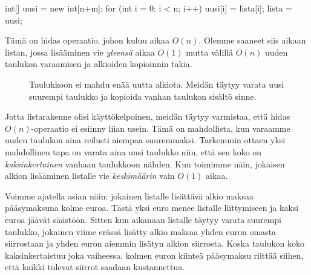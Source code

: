 \begin{code}
int[] uusi = new int[n+m];
for (int i = 0; i < n; i++) {
    uusi[i] = lista[i];
}
lista = uusi;
\end{code}

Tämä on hidas operaatio, johon kuluu aikaa $O(n)$.
Olemme saaneet siis aikaan listan, jossa lisääminen vie
\emph{yleensä} aikaa $O(1)$ mutta välillä $O(n)$
uuden taulukon varaamisen ja alkioiden kopioinnin takia.

\begin{figure}
\center
{}
\caption{Taulukkoon ei mahdu enää uutta alkiota. Meidän täytyy varata uusi suurempi taulukko
ja kopioida vanhan taulukon sisältö sinne.}
\label{fig:lisuus}
\end{figure}

Jotta listarakenne olisi käyttökelpoinen, meidän täytyy varmistaa,
että hidas $O(n)$-operaatio ei esiinny liian usein.
Tämä on mahdollista, kun varaamme uuden taulukon aina reilusti aiempaa suuremmaksi.
Tarkemmin ottaen yksi mahdollinen tapa on varata aina uusi taulukko niin,
että sen koko on \emph{kaksinkertainen} vanhaan taulukkoon nähden.
Kun toimimme näin, jokaisen alkion lisääminen listalle vie
\emph{keskimäärin} vain $O(1)$ aikaa.

Voimme ajatella asian näin: jokainen listalle lisättävä alkio
maksaa pääsy\-maksuna kolme euroa.
Tästä yksi euro menee listalle liittymiseen ja kaksi euroa jäävät säästöön.
Sitten kun aikanaan listalle täytyy varata suurempi taulukko,
jokainen viime erässä lisätty alkio maksaa yhden euron omasta siirrostaan
ja yhden euron aiemmin lisätyn alkion siirrosta.
Koska taulukon koko kaksinkertaistuu joka vaiheessa,
kolmen euron kiinteä pääsymaksu riittää siihen, että kaikki tulevat
siirrot saadaan kustannettua.

